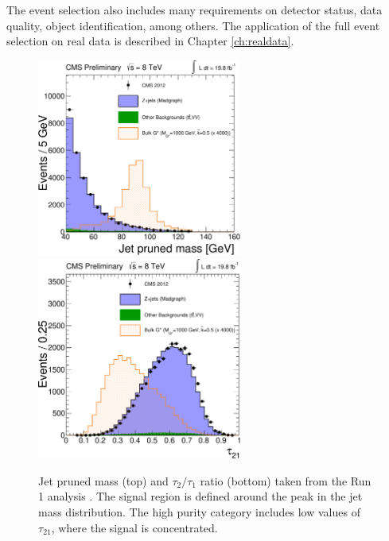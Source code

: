 The event selection also includes many requirements on detector status, data quality, object identification, among others. The application of the full event selection on real data is described in Chapter \ref{ch:realdata}.


\begin{figure}[p]
\centering
\includegraphics[width=0.6\textwidth]{figures/objects/makePrunedMassPlotForPAS.pdf}\\\vspace{0.5cm}
\includegraphics[width=0.6\textwidth]{figures/objects/makeNSubjPlotForPAS.pdf}
\caption[Run 1 analysis]{Jet pruned mass (top) and $\tau_2/\tau_1$ ratio (bottom) taken from the Run 1 analysis \cite{CMS:2013dfa}. The signal region is defined around the peak in the jet mass distribution. The high purity category includes low values of $\tau_{21}$, where the signal is concentrated.}
\label{fig:run1plots}
\end{figure}


